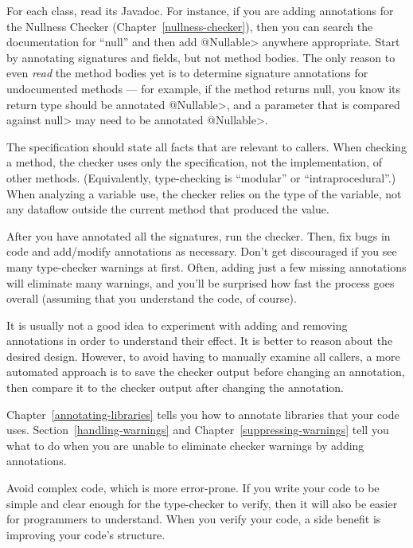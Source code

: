 For each class, read its Javadoc.  For instance, if you are adding
annotations for the Nullness Checker (Chapter~\ref{nullness-checker}), then
you can search the documentation for ``null'' and then add \<@Nullable>
anywhere appropriate.  Start by annotating signatures and fields, but not
method bodies.  The only reason to even
\emph{read} the method bodies yet is to determine signature annotations for
undocumented methods ---
for example, if the method returns null, you know its return type should be
annotated \<@Nullable>, and a parameter that is compared against \<null>
may need to be annotated \<@Nullable>.

The specification should state all facts that are relevant to callers.
When checking a method, the checker uses only the specification, not the
implementation, of other methods.  (Equivalently, type-checking is
``modular'' or ``intraprocedural''.)  When analyzing a variable use, the
checker relies on the type of the variable, not any dataflow outside the
current method that produced the value.

After you have annotated all the signatures, run the checker.
Then, fix bugs in code and add/modify annotations as necessary.
Don't get discouraged if you see many type-checker warnings at first.
Often, adding just a few missing annotations will eliminate many warnings,
and you'll be surprised how fast the process goes overall (assuming that
you understand the code, of course).

It is usually not a good idea to experiment with adding and removing
annotations in order to understand their effect.  It is better to reason
about the desired design.  However, to avoid having to manually examine all
callers, a more automated approach is to save the checker output before
changing an annotation, then compare it to the checker output after
changing the annotation.

Chapter~\ref{annotating-libraries} tells you how to annotate libraries that
your code uses.  Section~\ref{handling-warnings} and
Chapter~\ref{suppressing-warnings} tell you what to do when you are unable
to eliminate checker warnings by adding annotations.



Avoid complex code, which is more error-prone.  If you write your code to
be simple and clear enough for the type-checker to verify, then it will
also be easier for programmers to understand.  When you verify your code, a
side benefit is improving your code's structure.

